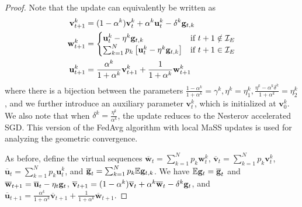 \begin{proof}
	
	Note that the update can equivalently be written as 
	\begin{align*}
	\mathbf{v}_{t+1}^{k} & =(1-\alpha^{k})\mathbf{v}_{t}^{k}+\alpha^{k}\mathbf{u}_{t}^{k}-\delta^{k}{\mathbf{g}}_{t,k}\\
	\mathbf{w}_{t+1}^{k} & =\begin{cases}
	\mathbf{u}_{t}^{k}-\eta^{k}{\mathbf{g}}_{t,k} & \text{if }t+1\notin\mathcal{I}_{E}\\
	\sum_{k=1}^{N}p_{k}\left[\mathbf{u}_{t}^{k}-\eta^{k}{\mathbf{g}}_{t,k}\right] & \text{if }t+1\in\mathcal{I}_{E}
	\end{cases}\\
	\mathbf{u}_{t+1}^{k} & =\frac{\alpha^{k}}{1+\alpha^{k}}\mathbf{v}_{t+1}^{k}+\frac{1}{1+\alpha^{k}}\mathbf{w}_{t+1}^{k}
	\end{align*}
	where there is a bijection between the parameters $\frac{1-\alpha^{k}}{1+\alpha^{k}}=\gamma^{k},\eta^{k}=\eta_{1}^{k},\frac{\eta^{k}-\alpha^{k}\delta^{k}}{1+\alpha^{k}}=\eta_{2}^{k}$,
	and we further introduce an auxiliary parameter $\mathbf{v}_{t}^{k}$,
	which is initialized at $\mathbf{v}_{0}^{k}$. We also note that when
	$\delta^{k}=\frac{\eta^{k}}{\alpha^{k}}$, the update reduces to the
	Nesterov accelerated SGD. This version of the FedAvg algorithm with
	local MaSS updates is used for analyzing the geometric convergence. 
	
	As before, define the virtual sequences $\overline{\mathbf{w}}_{t}=\sum_{k=1}^{N}p_{k}\mathbf{w}_{t}^{k}$,
	$\overline{\mathbf{v}}_{t}=\sum_{k=1}^{N}p_{k}\mathbf{v}_{t}^{k}$,
	$\overline{\mathbf{u}}_{t}=\sum_{k=1}^{N}p_{k}\mathbf{u}_{t}^{k}$,
	and ${\overline{\mathbf{g}}}_{t}=\sum_{k=1}^{N}p_{k}\mathbb{E}{\mathbf{g}}_{t,k}$. We have
	$\mathbb{E}{\mathbf{g}}_{t}={\overline{\mathbf{g}}}_{t}$ and $\overline{\mathbf{w}}_{t+1}=\overline{\mathbf{u}}_{t}-\eta_{t}{\mathbf{g}}_{t}$,
	$\overline{\mathbf{v}}_{t+1}=(1-\alpha^{k})\overline{\mathbf{v}}_{t}+\alpha^{k}\overline{\mathbf{w}}_{t}-\delta^{k}{\mathbf{g}}_{t}$,
	and $\overline{\mathbf{u}}_{t+1}=\frac{\alpha^{k}}{1+\alpha^{k}}\overline{\mathbf{v}}_{t+1}+\frac{1}{1+\alpha^{k}}\overline{\mathbf{w}}_{t+1}$.
	

\end{proof}
